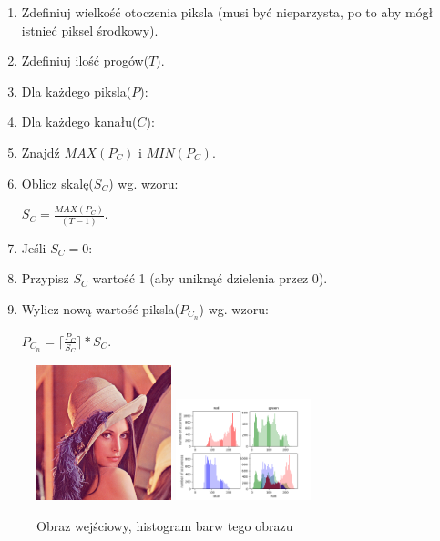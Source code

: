 \documentclass[final,a4paper,openany,12pt]{mwbk}
\begin{document}
\begin{enumerate}
	\item Zdefiniuj wielkość otoczenia piksla (musi być nieparzysta, po to aby mógł istnieć piksel środkowy).
	\item Zdefiniuj ilość progów($T$).
	\item Dla każdego piksla($P$):
	\item Dla każdego kanału($C$):
	\item Znajdź $MAX(P_C)$ i $MIN(P_C)$.
	\item Oblicz skalę($S_C$) wg. wzoru:\\
	\centerline{$S_C = \frac{MAX(P_C)}{(T - 1)}$.}
	\item Jeśli $S_C = 0$:
	\item Przypisz $S_C$ wartość 1 (aby uniknąć dzielenia przez 0).
	\item Wylicz nową wartość piksla($P_{C_{n}}$) wg. wzoru:\\
	\centerline{$P_{C_{n}} = \lceil \frac{P_C}{S_C} \rceil * S_C $.}
\end{enumerate}


\begin{figure}[H]
	\begin{center}
		\includegraphics[width=0.35\textwidth]{lena_color}
		\includegraphics[width=0.35\textwidth]{lena_color_histogram}
	\end{center}
	\caption{Obraz wejściowy, histogram barw tego obrazu}
\end{figure}
\end{document}
